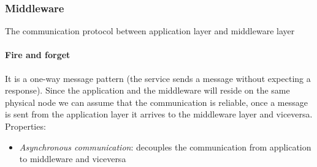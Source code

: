 \subsubsection{Middleware}
The communication protocol between application layer and middleware layer 
\paragraph{Fire and forget}
It is a one-way message pattern (the service sends a message without expecting a response). Since the application and the middleware will reside on the same physical node we can assume that the communication is reliable, once a message is sent from the application layer it arrives to the middleware layer and viceversa.
Properties:
\begin{itemize}
\item \textit{Asynchronous communication}: decouples the communication from application to middleware and viceversa
\end{itemize}
